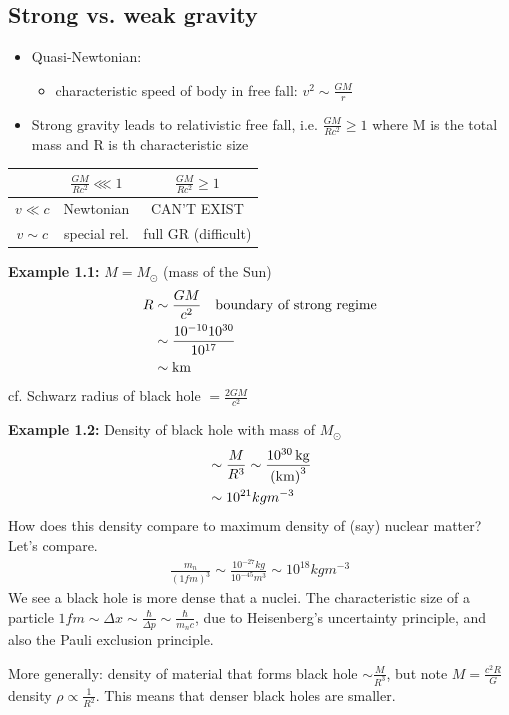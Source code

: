 \documentclass[a4paper]{article} %
\newcommand{\example}[2]
{
\begin{framed}
\textbf{Example #1:} #2
\end{framed}
}
\begin{document}
\subsection{Strong vs. weak gravity}
\begin{itemize}
\item Quasi-Newtonian:
\begin{itemize}
\item characteristic speed of body in free fall: $v^2\sim \frac{GM}{r}$
\end{itemize}
\item Strong gravity leads to relativistic free fall, i.e. $\frac{GM}{Rc^2}\geq 1$ where M is the total mass and R is th characteristic size
\end{itemize}

\begin{table}
\centering
\begin{tabular}{c|cc} 
 & $\frac{GM}{Rc^2} \lll 1$ & $\frac{GM}{Rc^2}\geq 1$\\
\hline $v \ll c$ & Newtonian & CAN'T EXIST \\
$v\sim c$ & special rel. & full GR (difficult)
\end{tabular}
\end{table}

\example{1.1}{
$M=M_{\odot}$ (mass of the Sun)
\begin{align*}
R & \sim \frac{GM}{c^2} \text{\quad boundary of strong regime}\\
&\sim \frac{10^{-10}10^{30}}{10^{17}}\\
&\sim \text{km}
\end{align*}
cf. Schwarz radius of black hole $=\frac{2GM}{c^2}$
}
\example{1.2}{
Density of black hole with mass of $M_\odot$
\begin{align*}
&\sim \frac{M}{R^3}\sim\frac{\SI{d30}{kg}}{\si{(km)^3}}\\
&\sim 10^{21}kgm^{-3}
\end{align*}
How does this density compare to maximum density of (say) nuclear matter? Let's compare.
\begin{align*}
\frac{m_n}{(1fm)^3}\sim \frac{10^{-27}kg}{10^{-45}m^3}\sim 10^{18}kgm^{-3}
\end{align*}
We see a black hole is more dense that a nuclei. The characteristic size of a particle $1fm\sim\Delta x\sim \frac{\hbar}{\Delta p}\sim \frac{\hbar}{m_n c}$, due to Heisenberg's uncertainty principle, and also the Pauli exclusion principle.
}
More generally: density of material that forms black hole $\sim\frac{M}{R^3}$, but note $M=\frac{c^2R}{G}$ density $\rho \propto \frac{1}{R^2}$. This means that denser black holes are smaller.
\end{document}
